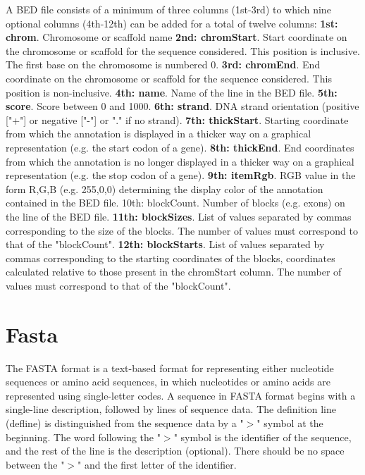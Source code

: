 \documentclass[11pt]{article}
\begin{document}
\begin{sloppypar}
A BED file consists of a minimum of three columns (1st-3rd) to which nine optional columns (4th-12th) can be added for a total of twelve columns:
\newline
\textbf{1st: chrom}. 
Chromosome or scaffold name
\newline
\textbf{2nd: chromStart}. 
Start coordinate on the chromosome or scaffold for the sequence considered. 
This position is inclusive. 
The first base on the chromosome is numbered 0.
\newline
\textbf{3rd: chromEnd}. 
End coordinate on the chromosome or scaffold for the sequence considered. 
This position is non-inclusive.
\newline
\textbf{4th: name}. 
Name of the line in the BED file.
\newline
\textbf{5th: score}. 
Score between 0 and 1000.
\newline
\textbf{6th: strand}. 
DNA strand orientation (positive ["+"] or negative ["-"] or "." if no strand).
\newline
\textbf{7th: thickStart}. 
Starting coordinate from which the annotation is displayed in a thicker way on a graphical representation (e.g. the start codon of a gene).
\newline
\textbf{8th: thickEnd}. 
End coordinates from which the annotation is no longer displayed in a thicker way on a graphical representation (e.g. the stop codon of a gene).
\newline
\textbf{9th: itemRgb}. 
RGB value in the form R,G,B (e.g. 255,0,0) determining the display color of the annotation contained in the BED file.
\newline
10th: blockCount. 
Number of blocks (e.g. exons) on the line of the BED file.
\newline
\textbf{11th: blockSizes}. 
List of values separated by commas corresponding to the size of the blocks. 
The number of values must correspond to that of the "blockCount".
\newline
\textbf{12th: blockStarts}. 
List of values separated by commas corresponding to the starting coordinates of the blocks, coordinates calculated relative to those present in the chromStart column. 
The number of values must correspond to that of the "blockCount".
  
\section{Fasta}
The FASTA format is a text-based format for representing either nucleotide sequences or amino acid sequences, in which nucleotides or amino acids are represented using single-letter codes. 
A sequence in FASTA format begins with a single-line description, followed by lines of sequence data. 
The definition line (defline) is distinguished from the sequence data by a "$>$" symbol at the beginning. 
The word following the "$>$" symbol is the identifier of the sequence, and the rest of the line is the description (optional). 
There should be no space between the "$>$" and the first letter of the identifier. 
  

\end{sloppypar}
\end{document}
